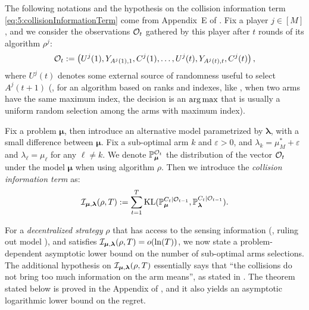The following notations and the hypothesis on the collision information term \eqref{eq:5:collisionInformationTerm} come from Appendix~E of \cite{KaufmannAbbas19}.
Fix a player $j\in[M]$, and we consider the observations $\mathcal{O}_t$ gathered by this player after $t$ rounds of its algorithm $\rho^j$:
\[ \mathcal{O}_t := \left( U^j(1), Y_{A^j(1),1}, C^j(1), \ldots, U^j(t), Y_{A^j(t),t}, C^j(t) \right),\]
where $U^j(t)$ denotes some external source of randomness useful to select $A^j(t+1)$ (\eg, for an algorithm based on ranks and \UCB{} indexes, like \RhoRand, when two arms have the same maximum index, the decision is an $\operatorname*{arg\,max}$ that is usually a uniform random selection among the arms with maximum index).

Fix a problem $\bm{\mu}$,
then introduce an alternative model parametrized by $\bm{\lambda}$, with a small difference between $\bm{\mu}$.
Fix a sub-optimal arm $k$ and $\varepsilon>0$, and $\lambda_k = \mu^*_M + \varepsilon$ and $\lambda_{\ell} = \mu_{\ell}$ for any $\ell\neq k$.
We denote $\mathbb{P}_{\bm{\mu}}^{\mathcal{O}_t}$ the distribution of the vector $\mathcal{O}_t$ under the model $\bm{\mu}$ when using algorithm $\rho$.
Then we introduce the \emph{collision information term} as:
\begin{equation}\label{eq:5:collisionInformationTerm}
  \mathcal{I}_{\bm{\mu},\bm{\lambda}}(\rho,T) := \sum_{t=1}^{T} \mathrm{KL}(\mathbb{P}_{\bm{\mu}}^{C_t | \mathcal{O}_{t-1}}, \mathbb{P}_{\bm{\lambda}}^{C_t | \mathcal{O}_{t-1}}).
\end{equation}

For a \emph{decentralized strategy} $\rho$ that has access to the sensing information (\ie, ruling out model \modeltrois), and satisfies $\mathcal{I}_{\bm{\mu},\bm{\lambda}}(\rho,T) = \mathop{}\mathopen{}o\mathopen{}\left(\ln(T)\right)$,
we now state a problem-dependent asymptotic lower bound on the number of sub-optimal arms selections.
The additional hypothesis on $\mathcal{I}_{\bm{\mu},\bm{\lambda}}(\rho,T)$ essentially says that ``the collisions do not bring too much information on the arm means'', as stated in \cite{KaufmannAbbas19}.
The theorem stated below is proved in the Appendix of \cite{Besson2018ALT},
and it also yields an asymptotic logarithmic lower bound on the regret.

